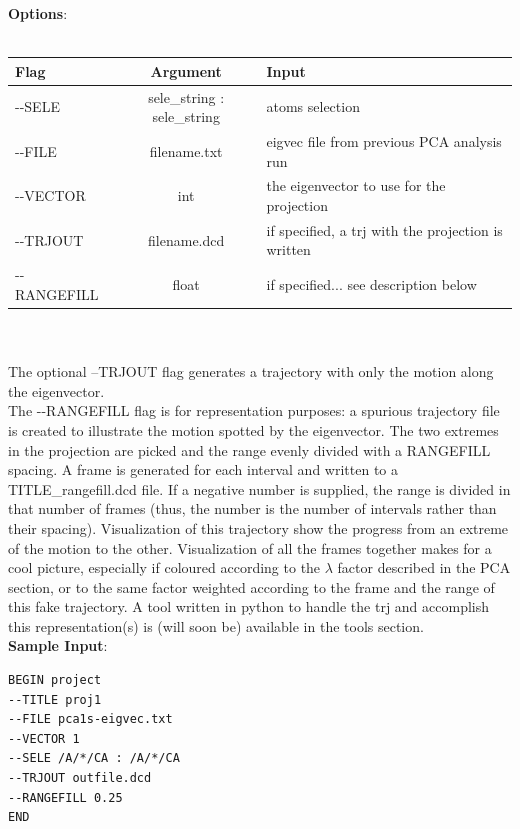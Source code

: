 \documentclass[11pt,twoside,onecolumn,a4paper,openright,notitlepage]{book}[2001/04/21]
\begin{document}
\textbf{\large Options}:\\\\
\begin{tabular}{l|c|p{7.0cm}}
Flag & Argument & Input \\
\hline
-{}-SELE          & sele\_string : sele\_string   & atoms selection\\
-{}-FILE          & filename.txt  & eigvec file from previous PCA analysis run\\
-{}-VECTOR        & int           & the eigenvector to use for the projection\\
-{}-TRJOUT        & filename.dcd  & if specified, a trj with the projection is written\\
-{}-RANGEFILL     & float         & if specified... see description below\\
\end{tabular}\\\\

The optional --TRJOUT flag generates a trajectory with only the motion along the eigenvector.\\
The -{}-RANGEFILL flag is for representation purposes: a spurious trajectory file is created to illustrate the motion spotted by the eigenvector. The two extremes in the projection are picked and the range evenly divided with a RANGEFILL spacing. A frame is generated for each interval and written to a TITLE\_rangefill.dcd file. If a negative number is supplied, the range is divided in that number of frames (thus, the number is the number of intervals rather than their spacing). Visualization of this trajectory show the progress from an extreme of the motion to the other. Visualization of all the frames together makes for a cool picture, especially if coloured according to the $\lambda$ factor described in the PCA section, or to the same factor weighted according to the frame and the range of this fake trajectory. A tool written in python to handle the trj and accomplish this representation(s) is (will soon be) available in the tools section.\\

\textbf{\large Sample Input}:
\begin{verbatim}
BEGIN project
--TITLE proj1
--FILE pca1s-eigvec.txt
--VECTOR 1
--SELE /A/*/CA : /A/*/CA
--TRJOUT outfile.dcd
--RANGEFILL 0.25
END
\end{verbatim}
\clearpage
\end{document}
